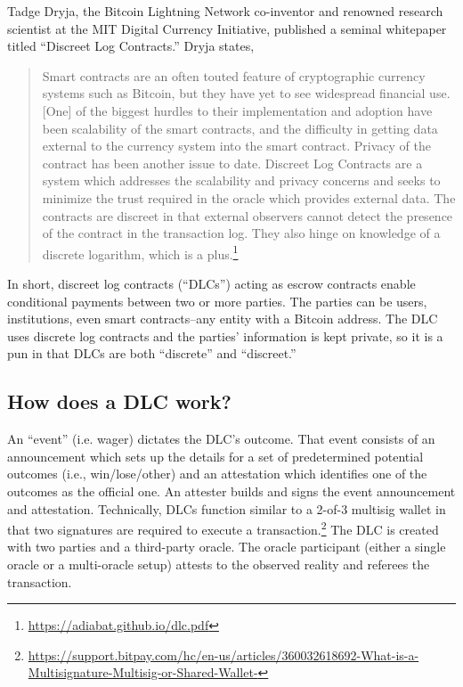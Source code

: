 \documentclass[twoside, a4paper, 11pt]{article}
\begin{document}
  Tadge Dryja, the Bitcoin Lightning Network co-inventor and renowned research scientist at the MIT Digital Currency Initiative, published a seminal whitepaper titled “Discreet Log Contracts.” Dryja states,
  \begin{quote}
    Smart contracts are an often touted feature of cryptographic currency
    systems such as Bitcoin, but they have yet to see widespread financial use.
    [One] of the biggest hurdles to their implementation and adoption have been
    scalability of the smart contracts, and the difficulty in getting data external
    to the currency system into the smart contract. Privacy of the contract has
    been another issue to date. Discreet Log Contracts are a system which
    addresses the scalability and privacy concerns and seeks to minimize the
    trust required in the oracle which provides external data. The contracts are
    discreet in that external observers cannot detect the presence of the contract
    in the transaction log. They also hinge on knowledge of a discrete logarithm,
    which is a plus.\footnote{\url{https://adiabat.github.io/dlc.pdf}}
  \end{quote}

  In short, discreet log contracts (“DLCs”) acting as escrow contracts enable conditional payments between two or more parties. The parties can be users, institutions, even smart contracts–any entity with a Bitcoin address. The DLC uses discrete log contracts and the parties’ information is kept private, so it is a pun in that DLCs are both “discrete” and “discreet.”

  \subsection{How does a DLC work?}

  An “event” (i.e. wager) dictates the DLC’s outcome. That event consists of an announcement which sets up the details for a set of predetermined potential outcomes (i.e., win/lose/other) and an attestation which identifies one of the outcomes as the official one. An attester builds and signs the event announcement and attestation. Technically, DLCs function similar to a 2-of-3 multisig wallet in that two signatures are required to execute a transaction.\footnote{\url{https://support.bitpay.com/hc/en-us/articles/360032618692-What-is-a-Multisignature-Multisig-or-Shared-Wallet-}} The DLC is created with two parties and a third-party oracle. The oracle participant (either a single oracle or a multi-oracle setup) attests to the observed reality and referees the transaction.
\end{document}
